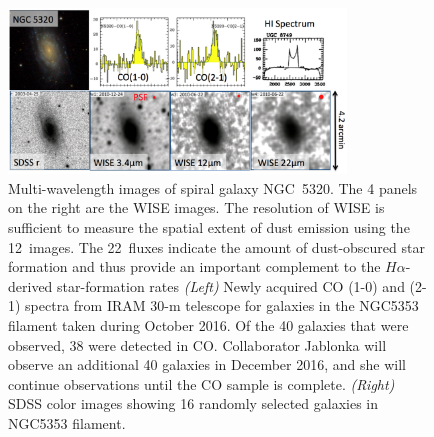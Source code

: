 \documentclass[11pt, preprint]{aastex}
\newcommand{\ha}{$H\alpha$}
\newcommand{\sers}{{\it S\'{e}rsic}}
\begin{document}
{\begin{figure}[h]
\centering
\includegraphics[width=0.8\textwidth]{NGC5320multiwaveV2.png}
\caption{\small 
Multi-wavelength images of spiral galaxy NGC~5320.  The 
  4 panels on the right are the WISE images. The resolution of WISE is
sufficient to measure the spatial extent of dust emission using the
12\micron \ images.  The 22\micron \ fluxes indicate the amount of
dust-obscured star formation and thus provide an important complement
to the \ha-derived star-formation rates
{\it (Left)} Newly acquired
  CO (1-0) and (2-1) spectra
  from IRAM 30-m telescope for galaxies in the NGC5353 filament taken
  during October 2016.  Of the 40 galaxies that were observed, 38 were
detected in CO.  Collaborator Jablonka will observe an additional 40
galaxies in December 2016, and she will continue observations until
the CO sample is complete.
{\it (Right)} SDSS color images showing 16 randomly
  selected galaxies in NGC5353 filament.  
}
\label{wiseCO}
\end{figure}




}
\end{document}
